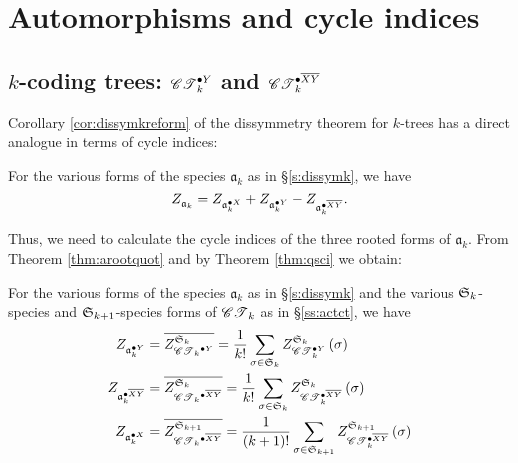 \documentclass[sectionflow,singlespace,twoside,boldmathhdr,draft]{brandiss} %
\numberwithin{section}{chapter}
\numberwithin{figure}{chapter}
\begin{document}
\section{Automorphisms and cycle indices}\label{s:ktcycind}
\subsection{$k$-coding trees: $\pointed[Y]{\specname{CT}}_{k}$ and $\pointed[\overline{XY}]{\specname{CT}}_{k}$}\label{ss:ctcycind}
Corollary \ref{cor:dissymkreform} of the dissymmetry theorem for $k$-trees has a direct analogue in terms of cycle indices:
\begin{theorem}
  \label{thm:dissymkci}
  For the various forms of the species $\mathfrak{a}_{k}$ as in \S \ref{s:dissymk}, we have
  \begin{equation}
    \label{eq:dissymkci}
    \ci{\mathfrak{a}_{k}} = \ci{\pointed[X]{\mathfrak{a}}_{k}} + \ci{\pointed[Y]{\mathfrak{a}}_{k}} - \ci{\pointed[\overline{XY}]{\mathfrak{a}}_{k}}.
  \end{equation}
\end{theorem}

Thus, we need to calculate the cycle indices of the three rooted forms of $\mathfrak{a}_{k}$.
From Theorem \ref{thm:arootquot} and by Theorem \ref{thm:qsci} we obtain:
\begin{theorem}
  \label{thm:aquotci}
  For the various forms of the species $\mathfrak{a}_{k}$ as in \S \ref{s:dissymk} and the various $\symgp{k}$-species and $\symgp{k+1}$-species forms of $\specname{CT}_{k}$ as in \S \ref{ss:actct}, we have
  \begin{subequations}
    \label{eq:aquotci}
    \begin{align}
      \ci{\pointed[Y]{\mathfrak{a}}_{k}} &= \qgci{\symgp{k}}{\pointed[Y]{\specname{CT}_{k}}} = \frac{1}{k!} \sum_{\sigma \in \symgp{k}} \gci{\symgp{k}}{\pointed[Y]{\specname{CT}}_{k}} \pbrac{\sigma} \label{eq:ayquotci} \\
      \ci{\pointed[\overline{XY}]{\mathfrak{a}}_{k}} &= \qgci{\symgp{k}}{\pointed[\overline{XY}]{\specname{CT}_{k}}} = \frac{1}{k!} \sum_{\sigma \in \symgp{k}} \gci{\symgp{k}}{\pointed[\overline{XY}]{\specname{CT}}_{k}} \pbrac{\sigma} \label{eq:axyquotci} \\
      \ci{\pointed[X]{\mathfrak{a}}_{k}} &= \qgci{\symgp{k+1}}{\pointed[\overline{XY}]{\specname{CT}_{k}}} = \frac{1}{\pbrac{k+1}!} \sum_{\sigma \in \symgp{k+1}} \gci{\symgp{k+1}}{\pointed[\overline{XY}]{\specname{CT}}_{k}} \pbrac{\sigma} \label{eq:axquotci}
    \end{align}
  \end{subequations}
\end{theorem}
\end{document}
